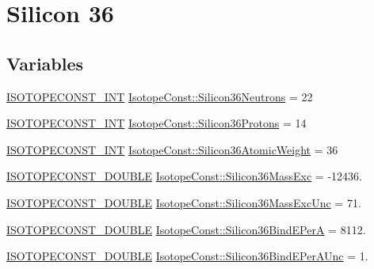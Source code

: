\hypertarget{group___isotope_const-_silicon-_si36}{}\section{Silicon 36}
\label{group___isotope_const-_silicon-_si36}
\subsection*{Variables}
\begin{DoxyCompactItemize}
\item 
\mbox{\hyperlink{group___isotope_const-_macros_ga5f18360b3e99483a35c32d789e62621c}{I\+S\+O\+T\+O\+P\+E\+C\+O\+N\+S\+T\+\_\+\+I\+NT}} \mbox{\hyperlink{group___isotope_const-_silicon-_si36_ga6e6efa8d05b2fe6cef6e8f4e073b55b7}{Isotope\+Const\+::\+Silicon36\+Neutrons}} = 22
\item 
\mbox{\hyperlink{group___isotope_const-_macros_ga5f18360b3e99483a35c32d789e62621c}{I\+S\+O\+T\+O\+P\+E\+C\+O\+N\+S\+T\+\_\+\+I\+NT}} \mbox{\hyperlink{group___isotope_const-_silicon-_si36_ga7a689f3387ebc44b89c63faf4cae4791}{Isotope\+Const\+::\+Silicon36\+Protons}} = 14
\item 
\mbox{\hyperlink{group___isotope_const-_macros_ga5f18360b3e99483a35c32d789e62621c}{I\+S\+O\+T\+O\+P\+E\+C\+O\+N\+S\+T\+\_\+\+I\+NT}} \mbox{\hyperlink{group___isotope_const-_silicon-_si36_ga3cccda6c034e8e204d8f4353c03624b5}{Isotope\+Const\+::\+Silicon36\+Atomic\+Weight}} = 36
\item 
\mbox{\hyperlink{group___isotope_const-_macros_ga8f45a7272ce02c0b4c65c44636ed719a}{I\+S\+O\+T\+O\+P\+E\+C\+O\+N\+S\+T\+\_\+\+D\+O\+U\+B\+LE}} \mbox{\hyperlink{group___isotope_const-_silicon-_si36_gad75a0e695574362bae2eb355b5068f1a}{Isotope\+Const\+::\+Silicon36\+Mass\+Exc}} = -\/12436.
\item 
\mbox{\hyperlink{group___isotope_const-_macros_ga8f45a7272ce02c0b4c65c44636ed719a}{I\+S\+O\+T\+O\+P\+E\+C\+O\+N\+S\+T\+\_\+\+D\+O\+U\+B\+LE}} \mbox{\hyperlink{group___isotope_const-_silicon-_si36_gaeded9e90c36e22c1ff21c4a60e5873ea}{Isotope\+Const\+::\+Silicon36\+Mass\+Exc\+Unc}} = 71.
\item 
\mbox{\hyperlink{group___isotope_const-_macros_ga8f45a7272ce02c0b4c65c44636ed719a}{I\+S\+O\+T\+O\+P\+E\+C\+O\+N\+S\+T\+\_\+\+D\+O\+U\+B\+LE}} \mbox{\hyperlink{group___isotope_const-_silicon-_si36_ga2c599b0a977e7fe5542e0bf0f109f7b8}{Isotope\+Const\+::\+Silicon36\+Bind\+E\+PerA}} = 8112.
\item 
\mbox{\hyperlink{group___isotope_const-_macros_ga8f45a7272ce02c0b4c65c44636ed719a}{I\+S\+O\+T\+O\+P\+E\+C\+O\+N\+S\+T\+\_\+\+D\+O\+U\+B\+LE}} \mbox{\hyperlink{group___isotope_const-_silicon-_si36_ga3745b9bbfe753357bacce273408d3501}{Isotope\+Const\+::\+Silicon36\+Bind\+E\+Per\+A\+Unc}} = 1.

\end{DoxyCompactItemize}

